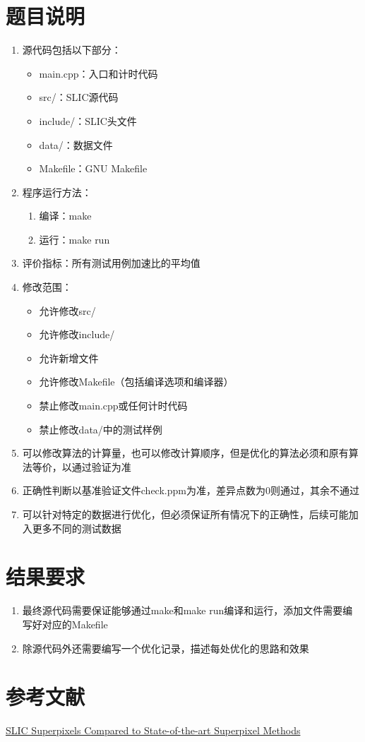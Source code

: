 \documentclass{ctexart}
\begin{document}
\section{题目说明}
\begin{enumerate}
    \item 源代码包括以下部分：
    \begin{itemize}
        \item main.cpp：入口和计时代码
        \item src/：SLIC源代码
        \item include/：SLIC头文件
        \item data/：数据文件
        \item Makefile：GNU Makefile
    \end{itemize}
    \item 程序运行方法：
    \begin{enumerate}
        \item 编译：make
        \item 运行：make run
    \end{enumerate}
    \item 评价指标：所有测试用例加速比的平均值
    \item 修改范围：
    \begin{itemize}
        \item 允许修改src/
        \item 允许修改include/
        \item 允许新增文件
        \item 允许修改Makefile（包括编译选项和编译器）
        \item 禁止修改main.cpp或任何计时代码
        \item 禁止修改data/中的测试样例
    \end{itemize}
    \item 可以修改算法的计算量，也可以修改计算顺序，但是优化的算法必须和原有算法等价，以通过验证为准
    \item 正确性判断以基准验证文件check.ppm为准，差异点数为0则通过，其余不通过
    \item 可以针对特定的数据进行优化，但必须保证所有情况下的正确性，后续可能加入更多不同的测试数据
\end{enumerate}

\section{结果要求}
\begin{enumerate}
    \item 最终源代码需要保证能够通过make和make run编译和运行，添加文件需要编写好对应的Makefile
    \item 除源代码外还需要编写一个优化记录，描述每处优化的思路和效果
\end{enumerate}
\section{参考文献}

\href{https://core.ac.uk/download/pdf/147983593.pdf}{SLIC Superpixels Compared to State-of-the-art
Superpixel Methods}
\end{document}
